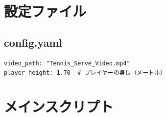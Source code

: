 \documentclass[oneside]{suribt}[11pt]
\begin{document}
\section{設定ファイル}

\subsection{config.yaml}
\begin{lstlisting}
video_path: "Tennis_Serve_Video.mp4"
player_height: 1.70  # プレイヤーの身長（メートル）
\end{lstlisting}

\section{メインスクリプト}
\end{document}
